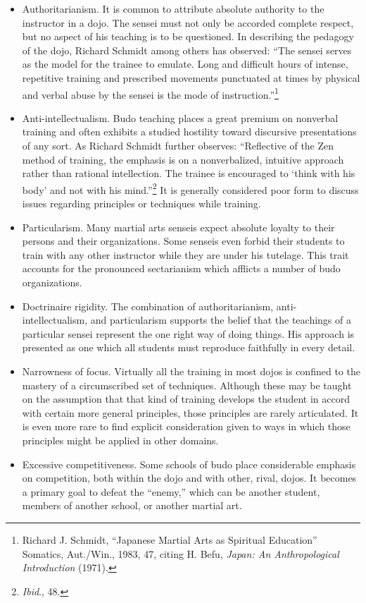 \begin{itemize}
\item Authoritarianism. It is common to attribute absolute authority to the instructor in a dojo. The sensei must not only be accorded complete respect, but no aspect of his teaching is to be questioned. In describing the pedagogy of the dojo, Richard Schmidt among others has observed: ``The sensei serves as the model for the trainee to emulate. Long and difficult hours of intense, repetitive training and prescribed movements punctuated at times by physical and verbal abuse by the sensei is the mode of instruction.''\footnote{Richard J. Schmidt, ``Japanese Martial Arts as Spiritual Education'' Somatics, Aut./Win., 1983, 47, citing H. Befu, \emph{Japan: An Anthropological Introduction} (1971).}
\item Anti-intellectualism. Budo teaching places a great premium on nonverbal training and often exhibits a studied hostility toward discursive presentations of any sort. As Richard Schmidt further observes: ``Reflective of the Zen method of training, the emphasis is on a nonverbalized, intuitive approach rather than rational intellection. The trainee is encouraged to `think with his body' and not with his mind.''\footnote{\emph{Ibid}., 48.} It is generally considered poor form to discuss issues regarding principles or techniques while training.
\item Particularism. Many martial arts senseis expect absolute loyalty to their persons and their organizations. Some senseis even forbid their students to train with any other instructor while they are under his tutelage. This trait accounts for the pronounced sectarianism which afflicts a number of budo organizations.
\item Doctrinaire rigidity. The combination of authoritarianism, anti-intellectualism, and particularism supports the belief that the teachings of a particular sensei represent the one right way of doing things. His approach is presented as one which all students must reproduce faithfully in every detail.
\item Narrowness of focus. Virtually all the training in most dojos is confined to the mastery of a circumscribed set of techniques. Although these may be taught on the assumption that that kind of training develops the student in accord with certain more general principles, those principles are rarely articulated. It is even more rare to find explicit consideration given to ways in which those principles might be applied in other domains. 
\item Excessive competitiveness. Some schools of budo place considerable emphasis on competition, both within the dojo and with other, rival, dojos. It becomes a primary goal to defeat the ``enemy,'' which can be another student, members of another school, or another martial art.
\end{itemize}

